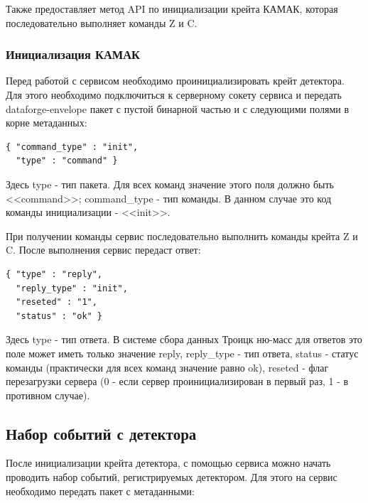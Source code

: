 \documentclass[a4paper,14pt]{extreport}
\begin{document}
\bigskip

Также предоставляет метод API по инициализации крейта КАМАК, которая последовательно выполняет команды Z и C.

\subsubsection{Инициализация КАМАК}

Перед работой с сервисом необходимо проинициализировать крейт детектора. Для этого необходимо подключиться к серверному сокету сервиса и передать dataforge-envelope пакет с пустой бинарной частью и с следующими полями в корне метаданных:

\begin{lstlisting}[caption={Команда иниализации крейта КАМАК детектора.}, captionpos=b]
{ "command_type" : "init",
  "type" : "command" }
\end{lstlisting}

Здесь type - тип пакета. Для всех команд значение этого поля должно быть <<command>>; command\_type - тип команды. В данном случае это код команды инициализации - <<init>>.

При получении команды сервис последовательно выполнить команды крейта Z и C. После выполнения сервис передаст ответ:

\begin{lstlisting}[caption={Сообщение об успешной иниализации сервиса детектора.}, captionpos=b]
{ "type" : "reply",
  "reply_type" : "init",
  "reseted" : "1",
  "status" : "ok" }
\end{lstlisting}

Здесь type - тип ответа. В системе сбора данных Троицк ню-масс для ответов это поле может иметь только значение reply, reply\_type - тип ответа, status - статус команды (практически для всех команд значение равно ok), reseted - флаг перезагрузки сервера (0 - если сервер проинициализирован в первый раз, 1 - в противном случае).

\subsection{Набор событий с детектора}

После инициализации крейта детектора, с помощью сервиса можно начать проводить набор событий, регистрируемых детектором. Для этого на сервис необходимо передать пакет с метаданными:
\end{document}
